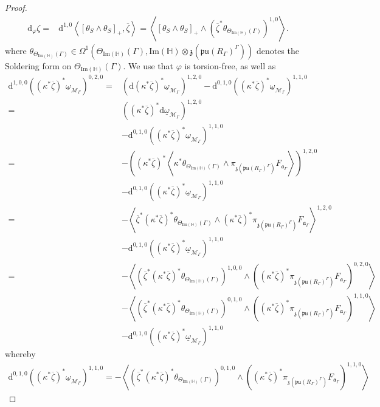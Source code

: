 \documentclass[psamsfonts]{amsart}
\theoremstyle{plain}
\theoremstyle{definition}{
\newtheorem{defi}{Definition}[section]
\newtheorem{ass}{Assumption}
\newtheorem*{nota}{Notation}}
\theoremstyle{remark}{
\newtheorem{rem}{Remark}
\newtheorem{ex}{Example}}
\theoremstyle{plain}{
\newtheorem{thm}{Theorem}[section]
\newtheorem{lem}{Lemma}[section]
\newtheorem{cor}{Corollary}[section]
\newtheorem{prop}{Proposition}[section]
\newtheorem{con}{Conjecture}[section]}
\newcommand{\m}[1]{{\mathrm{#1}}}
\begin{document}
\begin{proof}
\begin{align*}
    \m{d}_{\varphi}\zeta=&\m{d}^{1,0}\left<\left[\theta_{S}\wedge\theta_S\right]_+,\overline{\zeta}\right>=\left<\left[\theta_{S}\wedge\theta_S\right]_+\wedge(\overline{\zeta}^*\theta_{\Theta_{\m{Im}(\mathbb{H})}(\Gamma)})^{1,0}\right>.
\end{align*}
where $\theta_{\Theta_{\m{Im}(\mathbb{H})}(\Gamma)}\in \Omega^1(\Theta_{\m{Im}(\mathbb{H})}(\Gamma),\m{Im}(\mathbb{H})\otimes \mathfrak{z}(\mathfrak{pu}(R_\Gamma)^{\Gamma}))$ denotes the Soldering form on $\Theta_{\m{Im}(\mathbb{H})}(\Gamma)$. We use that $\varphi$ is torsion-free, as well as
\begin{align*}
    \m{d}^{1,0,0}((\kappa^*\overline{\zeta})^*\underline{\omega}_{\mathcal{M}_\Gamma})^{0,2,0}=&(\m{d}(\kappa^*\overline{\zeta})^*\underline{\omega}_{\mathcal{M}_\Gamma})^{1,2,0}-\m{d}^{0,1,0}((\kappa^*\overline{\zeta})^*\underline{\omega}_{\mathcal{M}_\Gamma})^{1,1,0}\\
    =&((\kappa^*\overline{\zeta})^*\m{d}\underline{\omega}_{\mathcal{M}_\Gamma})^{1,2,0}\\
    &-\m{d}^{0,1,0}((\kappa^*\overline{\zeta})^*\underline{\omega}_{\mathcal{M}_\Gamma})^{1,1,0}\\
    =&-\left((\kappa^*\overline{\zeta})^*\left<\kappa^*\theta_{\Theta_{\m{Im}(\mathbb{H})}(\Gamma)}\wedge\pi_{\mathfrak{z}(\mathfrak{pu}(R_\Gamma)^{\Gamma})}F_{\mathfrak{a}_\Gamma}\right>\right)^{1,2,0}\\
    &-\m{d}^{0,1,0}((\kappa^*\overline{\zeta})^*\underline{\omega}_{\mathcal{M}_\Gamma})^{1,1,0}\\
    =&-\left<\overline{\zeta}^*(\kappa^*\overline{\zeta})^*\theta_{\Theta_{\m{Im}(\mathbb{H})}(\Gamma)}\wedge(\kappa^*\overline{\zeta})^*\pi_{\mathfrak{z}(\mathfrak{pu}(R_\Gamma)^{\Gamma})}F_{\mathfrak{a}_\Gamma}\right>^{1,2,0}\\
    &-\m{d}^{0,1,0}((\kappa^*\overline{\zeta})^*\underline{\omega}_{\mathcal{M}_\Gamma})^{1,1,0}\\
    =&-\left<(\overline{\zeta}^*(\kappa^*\overline{\zeta})^*\theta_{\Theta_{\m{Im}(\mathbb{H})}(\Gamma)})^{1,0,0}\wedge((\kappa^*\overline{\zeta})^*\pi_{\mathfrak{z}(\mathfrak{pu}(R_\Gamma)^{\Gamma})}F_{\mathfrak{a}_\Gamma})^{0,2,0}\right>\\
    &-\left<(\overline{\zeta}^*(\kappa^*\overline{\zeta})^*\theta_{\Theta_{\m{Im}(\mathbb{H})}(\Gamma)})^{0,1,0}\wedge((\kappa^*\overline{\zeta})^*\pi_{\mathfrak{z}(\mathfrak{pu}(R_\Gamma)^{\Gamma})}F_{\mathfrak{a}_\Gamma})^{1,1,0}\right>\\
    &-\m{d}^{0,1,0}((\kappa^*\overline{\zeta})^*\underline{\omega}_{\mathcal{M}_\Gamma})^{1,1,0}
\end{align*}
whereby 
\begin{align*}
    \m{d}^{0,1,0}((\kappa^*\overline{\zeta})^*\underline{\omega}_{\mathcal{M}_\Gamma})^{1,1,0}=-\left<(\overline{\zeta}^*(\kappa^*\overline{\zeta})^*\theta_{\Theta_{\m{Im}(\mathbb{H})}(\Gamma)})^{0,1,0}\wedge((\kappa^*\overline{\zeta})^*\pi_{\mathfrak{z}(\mathfrak{pu}(R_\Gamma)^{\Gamma})}F_{\mathfrak{a}_\Gamma})^{1,1,0}\right>
\end{align*}


\end{proof}
\end{document}
